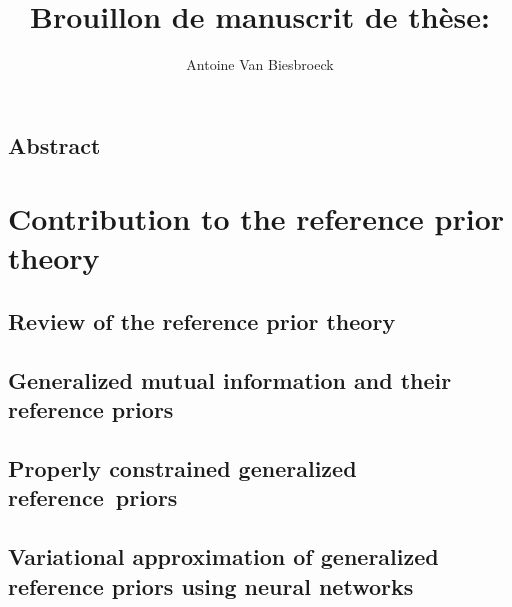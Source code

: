 \documentclass[a4paper]{book}
\title{Brouillon de manuscrit de thèse:\\ \PhDTitle}
\author{Antoine Van Biesbroeck}
\begin{document}
\pagestyle{empty}

\maketitle

\chapter*{Abstract}

\abstractEN



\dominitoc
\setcounter{tocdepth}{1}
\tableofcontents

\pagestyle{fancy}





\part{Contribution to the reference prior theory}\label{part:ref-theory}

\chapter{Review of the reference prior theory}\label{chap:intro-ref}




\chapter{Generalized mutual information and their reference priors}\label{chap:ref-generalized}




\chapter{Properly constrained generalized reference~priors}\label{chap:constrained-prior}




\chapter{Variational approximation of generalized reference priors using neural networks}\label{chap:varp}
\end{document}
